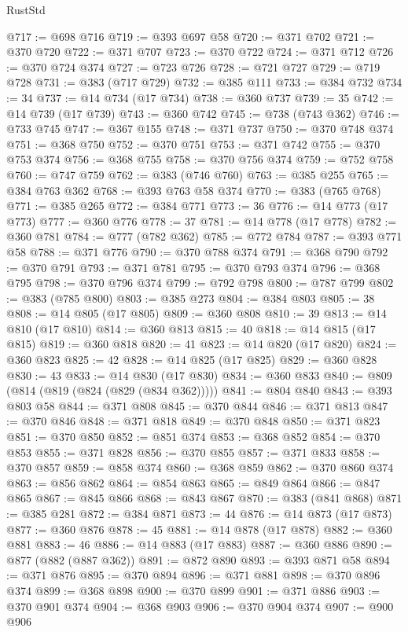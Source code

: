 \begin{lexlean}{RustStd}
\begin{coremodule}
@717 := @698 @716
@719 := @393 @697 @58
@720 := @371 @702
@721 := @370 @720
@722 := @371 @707
@723 := @370 @722
@724 := @371 @712
@726 := @370 @724 @374
@727 := @723 @726
@728 := @721 @727
@729 := @719 @728
@731 := @383 (@717 @729)
@732 := @385 @111
@733 := @384 @732
@734 := 34
@737 := @14 @734 (@17 @734)
@738 := @360 @737
@739 := 35
@742 := @14 @739 (@17 @739)
@743 := @360 @742
@745 := @738 (@743 @362)
@746 := @733 @745
@747 := @367 @155
@748 := @371 @737
@750 := @370 @748 @374
@751 := @368 @750
@752 := @370 @751
@753 := @371 @742
@755 := @370 @753 @374
@756 := @368 @755
@758 := @370 @756 @374
@759 := @752 @758
@760 := @747 @759
@762 := @383 (@746 @760)
@763 := @385 @255
@765 := @384 @763 @362
@768 := @393 @763 @58 @374
@770 := @383 (@765 @768)
@771 := @385 @265
@772 := @384 @771
@773 := 36
@776 := @14 @773 (@17 @773)
@777 := @360 @776
@778 := 37
@781 := @14 @778 (@17 @778)
@782 := @360 @781
@784 := @777 (@782 @362)
@785 := @772 @784
@787 := @393 @771 @58
@788 := @371 @776
@790 := @370 @788 @374
@791 := @368 @790
@792 := @370 @791
@793 := @371 @781
@795 := @370 @793 @374
@796 := @368 @795
@798 := @370 @796 @374
@799 := @792 @798
@800 := @787 @799
@802 := @383 (@785 @800)
@803 := @385 @273
@804 := @384 @803
@805 := 38
@808 := @14 @805 (@17 @805)
@809 := @360 @808
@810 := 39
@813 := @14 @810 (@17 @810)
@814 := @360 @813
@815 := 40
@818 := @14 @815 (@17 @815)
@819 := @360 @818
@820 := 41
@823 := @14 @820 (@17 @820)
@824 := @360 @823
@825 := 42
@828 := @14 @825 (@17 @825)
@829 := @360 @828
@830 := 43
@833 := @14 @830 (@17 @830)
@834 := @360 @833
@840 := @809 (@814 (@819 (@824 (@829 (@834 @362)))))
@841 := @804 @840
@843 := @393 @803 @58
@844 := @371 @808
@845 := @370 @844
@846 := @371 @813
@847 := @370 @846
@848 := @371 @818
@849 := @370 @848
@850 := @371 @823
@851 := @370 @850
@852 := @851 @374
@853 := @368 @852
@854 := @370 @853
@855 := @371 @828
@856 := @370 @855
@857 := @371 @833
@858 := @370 @857
@859 := @858 @374
@860 := @368 @859
@862 := @370 @860 @374
@863 := @856 @862
@864 := @854 @863
@865 := @849 @864
@866 := @847 @865
@867 := @845 @866
@868 := @843 @867
@870 := @383 (@841 @868)
@871 := @385 @281
@872 := @384 @871
@873 := 44
@876 := @14 @873 (@17 @873)
@877 := @360 @876
@878 := 45
@881 := @14 @878 (@17 @878)
@882 := @360 @881
@883 := 46
@886 := @14 @883 (@17 @883)
@887 := @360 @886
@890 := @877 (@882 (@887 @362))
@891 := @872 @890
@893 := @393 @871 @58
@894 := @371 @876
@895 := @370 @894
@896 := @371 @881
@898 := @370 @896 @374
@899 := @368 @898
@900 := @370 @899
@901 := @371 @886
@903 := @370 @901 @374
@904 := @368 @903
@906 := @370 @904 @374
@907 := @900 @906

\end{coremodule}
\end{lexlean}
